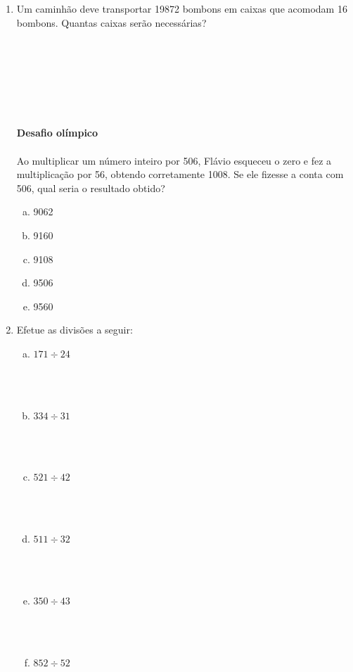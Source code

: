 \documentclass[a4paper,14pt]{article}
\begin{document}
\begin{multicols}{2}
\begin{enumerate}
    		\item Um caminhão deve transportar 19872 bombons em caixas que acomodam 16 bombons. Quantas caixas serão necessárias?\\\\\\\\\\\\\\\\
    		\textbf{Desafio olímpico}\\\\
    		Ao multiplicar um número inteiro por 506, Flávio esqueceu o zero e fez a multiplicação por 56, obtendo corretamente 1008. Se ele fizesse a conta com 506, qual seria o resultado obtido?
    		\begin{enumerate}[a)]
    			\item 9062
    			\item 9160
    			\item 9108
    			\item 9506
    			\item 9560
    		\end{enumerate}
    		\item Efetue as divisões a seguir:
    		\begin{enumerate}[a)]
    			\item $171 \div 24$ \\\\\\\\
    			\item $334 \div 31$ \\\\\\\\
    			\item $521 \div 42$ \\\\\\\\
    			\item $511 \div 32$ \\\\\\\\
    			\item $350 \div 43$ \\\\\\\\
    			\item $852 \div 52$ \\\\\\\\

\end{enumerate}
\end{enumerate}
\end{multicols}
\end{document}
